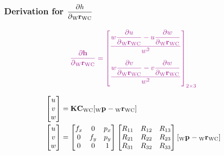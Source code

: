 \subsubsection*{Derivation for \color{Mulberry}
$\dfrac{\partial{h}}{\partial{{{{{{}_{{\text{W}}}} {{{\mathbf{r}}}}_{{\text{W}}{\text{C}}}}}}}}$}

\begin{align}
  \color{Mulberry}
  \dfrac{\partial{\projFunc}}{\partial{\camPos}} =
  \begin{bmatrix}
    \dfrac{
      w \dfrac{\partial{u}}{\partial{\camPos}} -
      u \dfrac{\partial{w}}{\partial{\camPos}}
    }{w^{2}} \vspace{1.0em} \\
    \dfrac{
      w \dfrac{\partial{v}}{\partial{\camPos}} -
      v \dfrac{\partial{w}}{\partial{\camPos}}
    }{w^{2}} \vspace{0.5em}
  \end{bmatrix}_{2 \times 3}
\end{align}

\begin{align}
  \begin{bmatrix} u \\ v \\ w \end{bmatrix}
    &= {\mathbf{K}} {{{{{{\mathbf{C}}}}_{{\text{W}}{\text{C}}}}}} [{{{{}_{{\text{W}}}} {{\mathbf{p}}}_{}}} - {{{{{}_{{\text{W}}}} {{{\mathbf{r}}}}_{{\text{W}}{\text{C}}}}}}]
    \nonumber \\
  \begin{bmatrix} u \\ v \\ w \end{bmatrix}
  &= \begin{bmatrix}
      f_x & 0 & p_x \\
      0 & f_y & p_y \\
      0 & 0 & 1
  \end{bmatrix}
  \begin{bmatrix}
      R_{11} & R_{12} & R_{13} \\
      R_{21} & R_{22} & R_{23} \\
      R_{31} & R_{32} & R_{33}
  \end{bmatrix}
  [{{{{}_{{\text{W}}}} {{\mathbf{p}}}_{}}} - {{{{{}_{{\text{W}}}} {{{\mathbf{r}}}}_{{\text{W}}{\text{C}}}}}}]
  \nonumber
\end{align}

